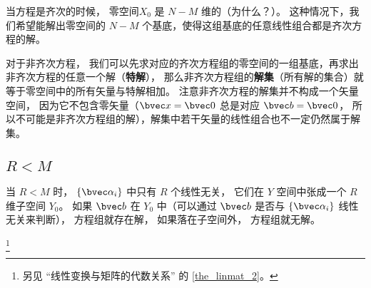 
当方程是齐次的时候， 零空间$X_0$ 是 $N- M$ 维的（为什么？）。 这种情况下，我们希望能解出零空间的 $N - M$ 个基底，使得这组基底的任意线性组合都是齐次方程的解。

对于非齐次方程， 我们可以先求对应的齐次方程组的零空间的一组基底，再求出非齐次方程的任意一个解（\textbf{特解}）， 那么非齐次方程组的\textbf{解集}（所有解的集合）就等于零空间中的所有矢量与特解相加。 注意非齐次方程的解集并不构成一个矢量空间， 因为它不包含零矢量（$\bvec x = \bvec 0$ 总是对应 $\bvec b = \bvec 0$， 所以不可能是非齐次方程组的解），解集中若干矢量的线性组合也不一定仍然属于解集。

\subsection{$R < M$}
当 $R < M$ 时， $\{\bvec \alpha_i\}$ 中只有 $R$ 个线性无关， 它们在 $Y$ 空间中张成一个 $R$ 维子空间 $Y_0$。 如果 $\bvec b$ 在 $Y_0$ 中（可以通过 $\bvec b$ 是否与 $\{\bvec \alpha_i\}$ 线性无关来判断）， 方程组就存在解， 如果落在子空间外， 方程组就无解。

\footnote{另见 “线性变换与矩阵的代数关系” 的 \autoref{the_linmat_2}。}
